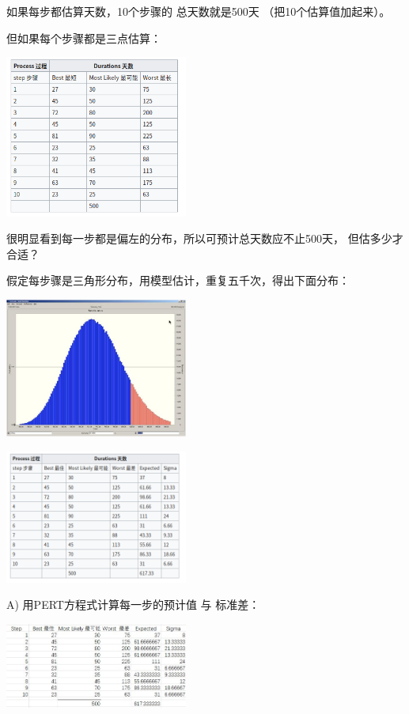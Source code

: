 如果每步都估算天数，10个步骤的 总天数就是500天 （把10个估算值加起来）。

但如果每个步骤都是三点估算：

\includegraphics[width=6cm]{Screenshotfrom20221215004743.png}

很明显看到每一步都是偏左的分布，所以可预计总天数应不止500天，
但估多少才合适？

假定每步骤是三角形分布，用模型估计，重复五千次，得出下面分布：


\includegraphics[width=6cm]{HMTTv13s77.png}

\includegraphics[width=6cm]{Screenshotfrom20221215004901.png}

A) 用PERT方程式计算每一步的预计值 与 标准差：


\includegraphics[width=6cm]{10stepsPertScreenshot20221024205007.jpg}


